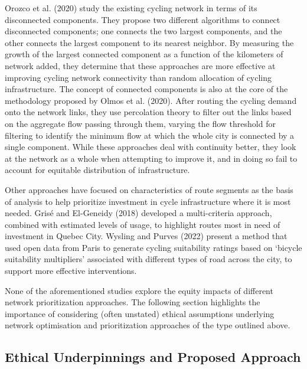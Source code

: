 \documentclass[
]{article}
\begin{document}
Orozco et al. (2020) study the existing cycling network in terms of its disconnected components.
They propose two different algorithms to connect disconnected components; one connects the two largest components, and the other connects the largest component to its nearest neighbor.
By measuring the growth of the largest connected component as a function of the kilometers of network added, they determine that these approaches are more effective at improving cycling network connectivity than random allocation of cycling infrastructure.
The concept of connected components is also at the core of the methodology proposed by Olmos et al. (2020).
After routing the cycling demand onto the network links, they use percolation theory to filter out the links based on the aggregate flow passing through them, varying the flow threshold for filtering to identify the minimum flow at which the whole city is connected by a single component.
While these approaches deal with continuity better, they look at the network as a whole when attempting to improve it, and in doing so fail to account for equitable distribution of infrastructure.

Other approaches have focused on characteristics of route segments as the basis of analysis to help prioritize investment in cycle infrastructure where it is most needed.
Grisé and El-Geneidy (2018) developed a multi-criteria approach, combined with estimated levels of usage, to highlight routes most in need of investment in Quebec City.
Wysling and Purves (2022) present a method that used open data from Paris to generate cycling suitability ratings based on `bicycle suitability multipliers' associated with different types of road across the city, to support more effective interventions.

None of the aforementioned studies explore the equity impacts of different network prioritization approaches.
The following section highlights the importance of considering (often unstated) ethical assumptions underlying network optimisation and prioritization approaches of the type outlined above.

\hypertarget{ethical-underpinnings-and-proposed-approach}{%
\subsection{Ethical Underpinnings and Proposed Approach}\label{ethical-underpinnings-and-proposed-approach}}
\end{document}
